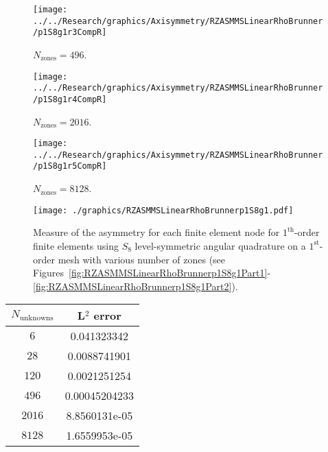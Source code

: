 \documentclass[12pt]{article}
\begin{document}
\begin{sidewaysfigure}[!htb]
\centering
\begin{subfigure}{0.33\textwidth}
\texttt{[image: ../../Research/graphics/Axisymmetry/RZASMMSLinearRhoBrunner/p1S8g1r3CompR]}
\caption{$N_\text{zones}=496$.}
\end{subfigure}%
\begin{subfigure}{0.33\textwidth}
\texttt{[image: ../../Research/graphics/Axisymmetry/RZASMMSLinearRhoBrunner/p1S8g1r4CompR]}
\caption{$N_\text{zones}=2016$.}
\end{subfigure}%
\begin{subfigure}{0.33\textwidth}
\texttt{[image: ../../Research/graphics/Axisymmetry/RZASMMSLinearRhoBrunner/p1S8g1r5CompR]}
\caption{$N_\text{zones}=8128$.}
\end{subfigure}
\caption{Relative asymmetry for $p=1$ finite elements on a $1^\text{st}$-order mesh for $S_8$ level-symmetric angular quadrature for $N_\text{zones}=\{496,2016,8128\}$; mesh overlay may be removed for clarity.}
\label{fig:RZASMMSLinearRhoBrunnerp1S8g1Part2}
\end{sidewaysfigure}

\begin{figure}[!htb]
\centering
\texttt{[image: ./graphics/RZASMMSLinearRhoBrunnerp1S8g1.pdf]}
\caption{Measure of the asymmetry for each finite element node for $1^\text{th}$-order finite elements using $S_8$ level-symmetric angular quadrature on a $1^\text{st}$-order mesh with various number of zones (see Figures~\ref{fig:RZASMMSLinearRhoBrunnerp1S8g1Part1}-\ref{fig:RZASMMSLinearRhoBrunnerp1S8g1Part2}).}
\label{fig:RZASMMSLinearRhoBrunnerp1S8g1Nodes}
\end{figure}

\begin{table}[!htb]
\centering
{\renewcommand{\arraystretch}{1.5}
\begin{tabular}{|c|c|}
\hline
$N_\text{unknowns}$ & L$^2$ error \\\hline
$6$ & 0.041323342 \\\hline
$28$ & 0.0088741901 \\\hline
$120$ & 0.0021251254 \\\hline
$496$ & 0.00045204233 \\\hline
$2016$ & 8.8560131e-05 \\\hline
$8128$ & 1.6559953e-05 \\\hline
\end{tabular}}
\end{table}
\end{document}
